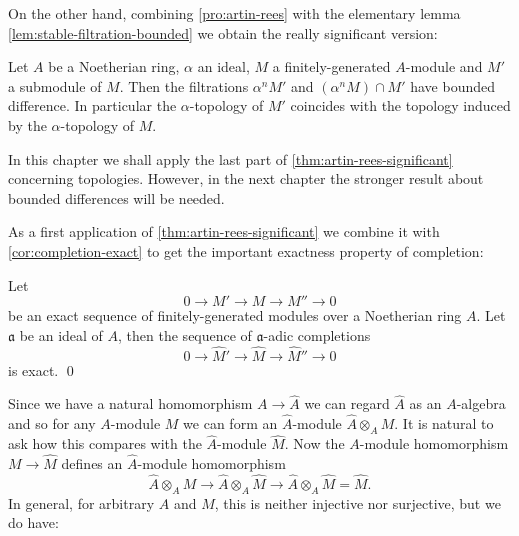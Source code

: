 On the other hand, combining \eqref{pro:artin-rees} with the elementary lemma \eqref{lem:stable-filtration-bounded} we obtain the really significant version:

\begin{theorem}\label{thm:artin-rees-significant}
    Let $A$ be a Noetherian ring, $\alpha$ an ideal, $M$ a finitely-generated $A$-module and $M'$ a submodule of $M$. Then the filtrations $\alpha^n M'$ and $(\alpha^n M) \cap M'$ have bounded difference. In particular the $\alpha$-topology of $M'$ coincides with the topology induced by the $\alpha$-topology of $M$. 
\end{theorem}

\begin{remark}
    In this chapter we shall apply the last part of \eqref{thm:artin-rees-significant} concerning topologies. However, in the next chapter the stronger result about bounded differences will be needed.
\end{remark}

As a first application of \eqref{thm:artin-rees-significant} we combine it with \eqref{cor:completion-exact} to get the important exactness property of completion:

\begin{proposition}\label{pro:completion-exact-sequence}
    Let
    \[
    0 \longrightarrow M' \longrightarrow M \longrightarrow M'' \longrightarrow 0
    \]
    be an exact sequence of finitely-generated modules over a Noetherian ring $A$. Let $\mathfrak{a}$ be an ideal of $A$, then the sequence of $\mathfrak{a}$-adic completions
    \[
    0 \longrightarrow \widehat{M}' \longrightarrow \widehat{M} \longrightarrow \widehat{M}'' \longrightarrow 0
    \]
    is exact. \qed
\end{proposition}

Since we have a natural homomorphism $A \to \widehat{A}$ we can regard $\widehat{A}$ as an $A$-algebra and so for any $A$-module $M$ we can form an $\widehat{A}$-module $\widehat{A} \otimes_A M$. It is natural to ask how this compares with the $\widehat{A}$-module $\widehat{M}$. Now the $A$-module homomorphism $M \to \widehat{M}$ defines an $\widehat{A}$-module homomorphism
\[
\widehat{A} \otimes_A M \longrightarrow \widehat{A} \otimes_A \widehat{M} \longrightarrow \widehat{A} \otimes_A \widehat{M} = \widehat{M}.
\]
In general, for arbitrary $A$ and $M$, this is neither injective nor surjective, but we do have:

